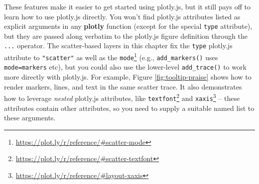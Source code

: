 \documentclass[
  12pt,
]{krantz}
\newenvironment{Shaded}{\begin{snugshade}}{\end{snugshade}}
\newcommand{\DataTypeTok}[1]{\textcolor[rgb]{0.13,0.29,0.53}{#1}}
\newcommand{\DecValTok}[1]{\textcolor[rgb]{0.00,0.00,0.81}{#1}}
\newcommand{\KeywordTok}[1]{\textcolor[rgb]{0.13,0.29,0.53}{\textbf{#1}}}
\newcommand{\NormalTok}[1]{#1}
\newcommand{\OperatorTok}[1]{\textcolor[rgb]{0.81,0.36,0.00}{\textbf{#1}}}
\newcommand{\StringTok}[1]{\textcolor[rgb]{0.31,0.60,0.02}{#1}}
\renewcommand{\href}[2]{#2\footnote{\url{#1}}}
\begin{document}
These features make it easier to get started using plotly.js, but it still pays off to learn how to use plotly.js directly. You won't find plotly.js attributes listed as explicit arguments in any \textbf{plotly} function (except for the special \texttt{type} attribute), but they are passed along verbatim to the plotly.js figure definition through the \texttt{...} operator. The scatter-based layers in this chapter fix the \texttt{type} plotly.js attribute to \texttt{"scatter"} as well as the \href{https://plot.ly/r/reference/\#scatter-mode}{\texttt{mode}} (e.g., \texttt{add\_markers()} uses \texttt{mode=\textquotesingle{}markers\textquotesingle{}} etc), but you could also use the lower-level \texttt{add\_trace()} to work more directly with plotly.js. For example, Figure \ref{fig:tooltip-praise} shows how to render markers, lines, and text in the same scatter trace. It also demonstrates how to leverage \emph{nested} plotly.js attributes, like \href{https://plot.ly/r/reference/\#scatter-textfont}{\texttt{textfont}} and \href{https://plot.ly/r/reference/\#layout-xaxis}{\texttt{xaxis}} -- these attributes contain other attributes, so you need to supply a suitable named list to these arguments.

\begin{Shaded}
\end{Shaded}
\end{document}
